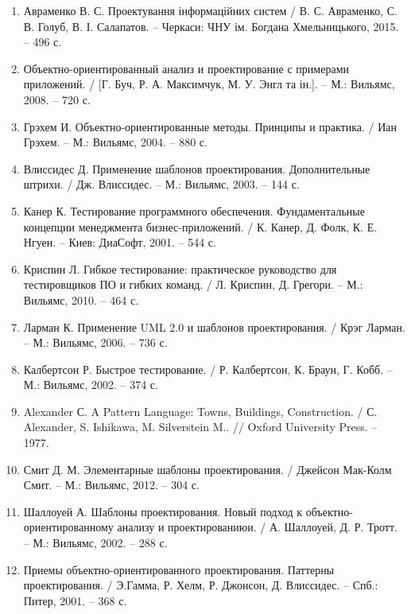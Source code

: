 \begin{enumerate}
	\item Авраменко В. С. Проектування інформаційних систем / В. С. Авраменко, С. В. Голуб, В. І. Салапатов. – Черкаси: ЧНУ ім. Богдана Хмельницького, 2015. – 496 с.
	\item Объектно-ориентированный анализ и проектирование с примерами приложений. / [Г. Буч, Р. А. Максимчук, М. У. Энгл та ін.]. – М.: Вильямс, 2008. – 720 с.
	\item Грэхем И. Объектно-ориентированные методы. Принципы и практика. / Иан Грэхем. – М.: Вильямс, 2004. – 880 с.
	\item Влиссидес Д. Применение шаблонов проектирования. Дополнительные штрихи. / Дж. Влиссидес. – М.: Вильямс, 2003. – 144 с.
	\item Канер К. Тестирование программного обеспечения. Фундаментальные концепции менеджмента бизнес-приложений. / К. Канер, Д. Фолк, К. Е. Нгуен. – Киев: ДиаСофт, 2001. – 544 с.
	\item Криспин Л. Гибкое тестирование: практическое руководство для тестировщиков ПО и гибких команд. / Л. Криспин, Д. Грегори. – М.: Вильямс, 2010. – 464 с.
	\item Ларман К. Применение UML 2.0 и шаблонов проектирования. / Крэг Ларман. – М.: Вильямс, 2006. – 736 с.
	\item Калбертсон Р. Быстрое тестирование. / Р. Калбертсон, К. Браун, Г. Кобб. – М.: Вильямс, 2002. – 374 с.
	\item Alexander С. A Pattern Language: Towns, Buildings, Construction. / С. Alexander, S. Ishikawa, M. Silverstein M.. // Oxford University Press. – 1977.
	\item Смит Д. М. Элементарные шаблоны проектирования. / Джейсон Мак-Колм Смит. – М.: Вильямс, 2012. – 304 с.
	\item Шаллоуей А. Шаблоны проектирования. Новый подход к объектно-ориентированному анализу и проектированиюи. / А. Шаллоуей, Д. Р. Тротт. – М.: Вильямс, 2002. – 288 с.
	\item Приемы объектно-ориентированного проектирования. Паттерны проектирования. / Э.Гамма, Р. Хелм, Р. Джонсон, Д. Влиссидес. – Спб.: Питер, 2001. – 368 с.
\end{enumerate}